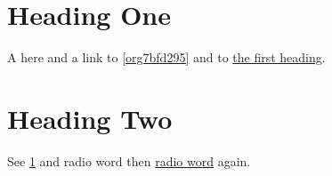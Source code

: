 \section{Heading One}
\label{sec:org1c59b52}
A \label{org7bfd295} here and a link to \ref{org7bfd295} and to \hyperref[sec:org1c59b52]{the first heading}.
\section{Heading Two}
\label{sec:org47118c0}
See \ref{sec:org1c59b52} and \label{orgaf3ed89}radio word then \hyperref[orgaf3ed89]{radio word} again.
